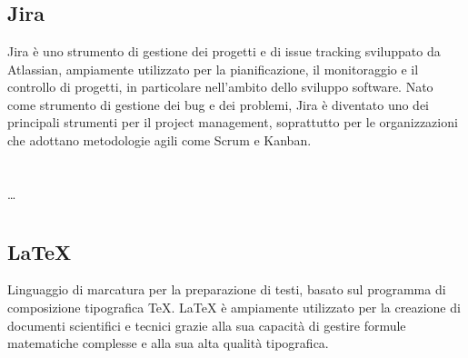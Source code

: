 
\section{}

\subsection*{Jira}
Jira è uno strumento di gestione dei progetti e di issue tracking sviluppato da Atlassian, ampiamente utilizzato per la pianificazione, il monitoraggio e 
il controllo di progetti, in particolare nell'ambito dello sviluppo software. Nato come strumento di gestione dei bug e dei problemi, Jira è diventato uno 
dei principali strumenti per il project management, soprattutto per le organizzazioni che adottano metodologie agili come Scrum e Kanban.

\newpage



\section{}

\dots

\newpage



\section{}

\subsection*{\LaTeX}
Linguaggio di marcatura per la preparazione di testi, basato sul programma di composizione tipografica TeX. LaTeX è ampiamente utilizzato per la creazione 
di documenti scientifici e tecnici grazie alla sua capacità di gestire formule matematiche complesse e alla sua alta qualità tipografica.

\newpage